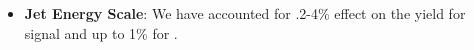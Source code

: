 \begin{itemize}


\item \textbf{Jet Energy Scale}: We have accounted for .2-4\% effect on the yield for signal and up to 1\% for \ttbar. %



\end{itemize}
